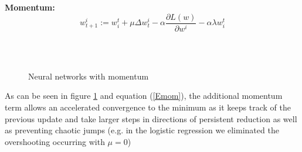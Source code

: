 \documentclass{acmsiggraph}
\newcommand{\1}{\mathbbm{1}}
\begin{document}
\textbf{Momentum:}
\begin{equation}
w^i_{t+1} := w_i^t +\mu \Delta w_t^i-\alpha \frac{\partial L(w)}{\partial w^i} - \alpha\lambda w_i^t
\end{equation}
\label{Emom}
\begin{figure}[H]
\centering
{}\\
\\
\caption{Neural networks with momentum\label{mom}}
\end{figure}

As can be seen in figure \ref{mom} and equation (\ref{Emom}), the additional momentum term allows an accelerated convergence to the minimum as it keeps track of the previous update and  take larger steps in directions of persistent reduction as well as preventing chaotic jumps (e.g. in the logistic regression we eliminated the overshooting occurring with $\mu=0$) 
\end{document}
